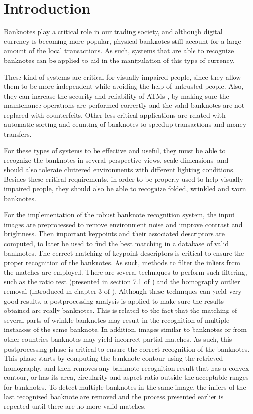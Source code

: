 \section{Introduction}\label{sec:introduction}

Banknotes play a critical role in our trading society, and although digital currency is becoming more popular, physical banknotes still account for a large amount of the local transactions. As such, systems that are able to recognize banknotes can be applied to aid in the manipulation of this type of currency.

These kind of systems are critical for visually impaired people, since they allow them to be more independent while avoiding the help of untrusted people. Also, they can increase the security and reliability of ATMs \cite{Sako2007}, by making sure the maintenance operations are performed correctly and the valid banknotes are not replaced with counterfeits. Other less critical applications are related with automatic sorting and counting of banknotes to speedup transactions and money transfers.

For these types of systems to be effective and useful, they must be able to recognize the banknotes in several perspective views, scale dimensions, and should also tolerate cluttered environments with different lighting conditions. Besides these critical requirements, in order to be properly used to help visually impaired people, they should also be able to recognize folded, wrinkled and worn banknotes.

For the implementation of the robust banknote recognition system, the input images are preprocessed to remove environment noise and improve contrast and brightness. Then important keypoints and their associated descriptors are computed, to later be used to find the best matching in a database of valid banknotes. The correct matching of keypoint descriptors is critical to ensure the proper recognition of the banknotes. As such, methods to filter the inliers from the matches are employed. There are several techniques to perform such filtering, such as the ratio test (presented in section 7.1 of \cite{Lowe2004}) and the homography outlier removal (introduced in chapter 3 of \cite{Baggio2012}). Although these techniques can yield very good results, a postprocessing analysis is applied to make sure the results obtained are really banknotes. This is related to the fact that the matching of several parts of wrinkle banknotes may result in the recognition of multiple instances of the same banknote. In addition, images similar to banknotes or from other countries banknotes may yield incorrect partial matches. As such, this postprocessing phase is critical to ensure the correct recognition of the banknotes. This phase starts by computing the banknote contour using the retrieved homography, and then removes any banknote recognition result that has a convex contour, or has its area, circularity and aspect ratio outside the acceptable ranges for banknotes. To detect multiple banknotes in the same image, the inliers of the last recognized banknote are removed and the process presented earlier is repeated until there are no more valid matches.

